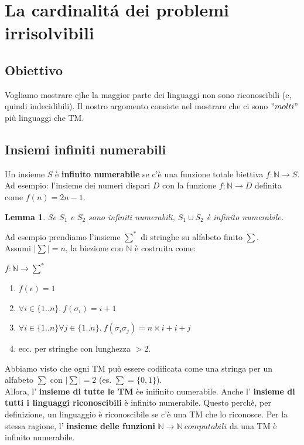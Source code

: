 \documentclass[a4paper, 12pt]{article}
\newtheorem{lemma}[theorem]{Lemma}
\begin{document}
\section{La cardinalit\'a dei problemi irrisolvibili}
\subsection{Obiettivo}
Vogliamo mostrare cjhe la maggior parte dei linguaggi non sono riconoscibili (e, quindi indecidibili). Il nostro argomento consiste nel mostrare che ci sono $"molti"$ pi\`u linguaggi che TM.
\subsection{Insiemi infiniti numerabili}
Un insieme $S$ \`e \textbf{infinito numerabile} se c'\`e una funzione totale biettiva $f: \mathbb{N} \rightarrow S$.
Ad esempio: l'insieme dei numeri dispari $D$ con la funzione $f: \mathbb{N} \rightarrow D$ definita come $f(n) = 2n - 1$.
\begin{lemma}
\label{lemma:1}
Se $S_1$ e $S_2$ sono infiniti numerabili, $S_{1} \cup S_{2}$ \`e infinito numerabile.
\end{lemma}
Ad esempio prendiamo l'insieme $\sum^{*}$ di stringhe su alfabeto finito $\sum$.\\Assumi $|\sum|=n$, la biezione con $\mathbb{N}$ \`e costruita come:
\begin{center}
$f: \mathbb{N} \rightarrow \sum^{*}$
\begin{enumerate}
\item $f(\epsilon) = 1$
\item $\forall i \in \{1..n\}.\ f(\sigma_{i}) = i + 1$
\item $\forall i \in \{1..n\} \forall j \in \{1..n\}.\ f(\sigma_{i} \sigma_{j})= n \times i + i+ j$
\item ecc. per stringhe con lunghezza $> 2$.
\end{enumerate}
\end{center}
Abbiamo visto che ogni TM pu\`o essere codificata come una stringa per un alfabeto $\sum$ con $|\sum| = 2$ (es. $\sum = \{0,1\}$).\\
Allora, l' \textbf{insieme di tutte le TM} \`ee inifinito numerabile. Anche l' \textbf{insieme di tutti i linguaggi riconoscibili} \`e infinito numerabile. Questo perch\`e, per definizione, un linguaggio \`e riconoscibile se c'\`e una TM che lo riconosce. Per la stessa ragione, l' \textbf{insieme delle funzioni} $\mathbb{N} \rightarrow \mathbb{N}\ computabili$ da una TM \`e infinito numerabile. 
\end{document}
